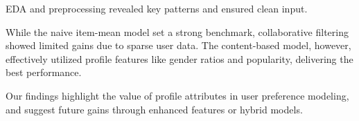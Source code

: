 EDA and preprocessing revealed key patterns and ensured clean input.

While the naive item-mean model set a strong benchmark, collaborative filtering showed limited gains due to sparse user data. The content-based model, however, effectively utilized profile features like gender ratios and popularity, delivering the best performance.

Our findings highlight the value of profile attributes in user preference modeling, and suggest future gains through enhanced features or hybrid models.